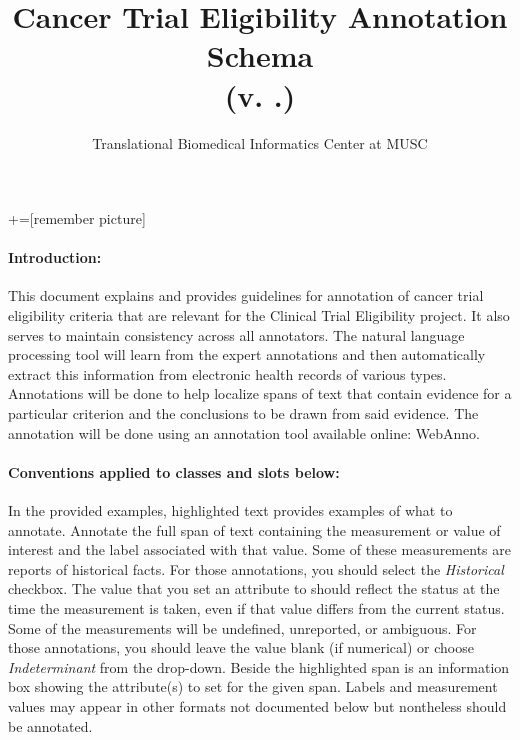 \documentclass[letterpaper]{article}
\title{Cancer Trial Eligibility Annotation Schema\\(v. \themajornumber.\theminornumber)}
\author{Translational Biomedical Informatics Center at MUSC}
\begin{document}
+=[remember picture]
\def\x{0}

\maketitle

\paragraph{Introduction:}
This document explains and provides guidelines for annotation of cancer trial eligibility criteria that are relevant for the Clinical Trial Eligibility project. 
It also serves to maintain consistency across all annotators. 
The natural language processing tool will learn from the expert annotations and then automatically extract this information from electronic health records of various types.
Annotations will be done to help localize spans of text that contain evidence for a particular criterion and the conclusions to be drawn from said evidence.
The annotation will be done using an annotation tool available online: WebAnno. 

\paragraph{Conventions applied to classes and slots below:}
In the provided examples, highlighted text provides examples of what to annotate.
Annotate the full span of text containing the measurement or value of interest and the label associated with that value.
Some of these measurements are reports of historical facts.
For those annotations, you should select the \textsl{Historical} checkbox.
The value that you set an attribute to should reflect the status at the time the measurement is taken, even if that value differs from the current status.
Some of the measurements will be undefined, unreported, or ambiguous.
For those annotations, you should leave the value blank (if numerical) or choose \textsl{Indeterminant} from the drop-down.
Beside the highlighted span is an information box showing the attribute(s) to set for the given span.
Labels and measurement values may appear in other formats not documented below but nontheless should be annotated.
\end{document}
